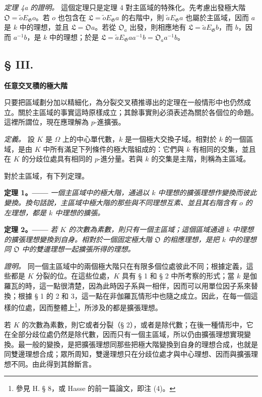 \documentclass[11pt]{article}
\providecommand{\Gg}{\mathfrak G}
\begin{document}
\medskip
\noindent\emph{定理 4a 的證明。} 這個定理只是定理 4 對主區域的特殊化。先考慮出發極大階 \(\mathfrak O=\widetilde oE_\Gg o\)。若 \(o\) 也包含在 \(\mathfrak L=\widetilde oE_\Gg a\) 的右階中，則 \(\widetilde aE_\Gg a\) 也屬於主區域，因而 \(a\) 是 \(k\) 中的理想，並且 \(\mathfrak L=\mathfrak Oa\)。若從 \(\mathfrak O_a\) 出發，則相應地有 \(\mathfrak L=\widetilde aE_\Gg b\)，而 \(b\)，因而 \(a^{-1}b\)，是 \(k\) 中的理想；於是
\(\mathfrak L=\widetilde aE_\Gg aa^{-1}b=\mathfrak O_a a^{-1}b\)。

\subsection*{§ III.}
\begin{center}
\textbf{任意交叉積的極大階}
\end{center}

只要把區域劃分加以精細化，為分裂交叉積推導出的定理在一般情形中也仍然成立。關於主區域的事實這時原樣成立；其餘事實則必須表述為關於各個位的命題。這裡所謂位，現在應理解為 \(p\)-進擴張。

\emph{定義。} 設 \(K\) 是 \(\Omega\) 上的中心單代數，\(k\) 是一個極大交換子域。相對於 \(k\) 的一個區域，是由 \(K\) 中所有滿足下列條件的極大階組成的：它們與 \(k\) 有相同的交集，並且在 \(K\) 的分歧位處具有相同的 \(p\)-進分量。若與 \(k\) 的交集是主階，則稱為主區域。

對於主區域，有下列定理。

\medskip
\noindent\textbf{定理 1。——} \emph{一個主區域中的極大階，通過以 \(k\) 中理想的擴張理想作變換而彼此變換。換句話說，主區域中極大階的那些與不同理想互素、並且其右階含有 \(o\) 的左理想，都是 \(k\) 中理想的擴張。}

\medskip
\noindent\textbf{定理 2。——} \emph{若 \(K\) 的次數為素數，則只有一個主區域；這個區域通過 \(k\) 中理想的擴張理想變換到自身。相對於一個固定極大階 \(\mathfrak O\) 的相應理想，是把 \(k\) 中的理想同 \(\mathfrak O\) 中的雙邊理想一起擴張所得的理想。}

\emph{證明。} 同一個主區域中的兩個極大階只在有限多個位處彼此不同；根據定義，這些都是 \(K\) 分裂的位。在這些位處，\(K\) 具有 § 1 和 § 2 中所考察的形式；當 \(k\) 是伽羅瓦的時，這一點很清楚，因為此時因子系與一相伴，因而可以用單位因子系來替換；根據 § 1 的 2 和 3，這一點在非伽羅瓦情形中也隨之成立。因此，在每一個這樣的位處，因而整體上\footnote{參見 H. § 8，或 Hasse 的前一篇論文，即注 (4)。}，所涉及的都是擴張理想。

若 \(K\) 的次數為素數，則它或者分裂（§ 2），或者是除代數；在後一種情形中，它在全部分歧位處仍然是除代數，因而只有一個主區域，所以仍由擴張理想實現變換。最一般的變換，是把擴張理想同那些把極大階變換到自身的理想合成，也就是同雙邊理想合成；眾所周知，雙邊理想只在分歧位處才與中心理想、因而與擴張理想不同。由此得到其餘斷言。
\end{document}

